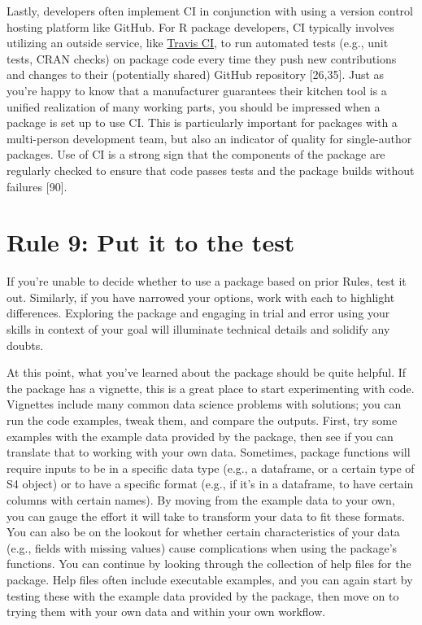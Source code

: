 \documentclass[10pt,letterpaper]{article}
\begin{document}
Lastly, developers often implement CI in conjunction with using a
version control hosting platform like GitHub. For R package developers,
CI typically involves utilizing an outside service, like
\href{https://travis-ci.org/}{Travis CI}, to run automated tests (e.g.,
unit tests, CRAN checks) on package code every time they push new
contributions and changes to their (potentially shared) GitHub
repository {[}26,35{]}. Just as you're happy to know that a manufacturer
guarantees their kitchen tool is a unified realization of many working
parts, you should be impressed when a package is set up to use CI. This
is particularly important for packages with a multi-person development
team, but also an indicator of quality for single-author packages. Use
of CI is a strong sign that the components of the package are regularly
checked to ensure that code passes tests and the package builds without
failures {[}90{]}.

\hypertarget{rule-9-put-it-to-the-test}{%
\section{Rule 9: Put it to the test}\label{rule-9-put-it-to-the-test}}

If you're unable to decide whether to use a package based on prior
Rules, test it out. Similarly, if you have narrowed your options, work
with each to highlight differences. Exploring the package and engaging
in trial and error using your skills in context of your goal will
illuminate technical details and solidify any doubts.

At this point, what you've learned about the package should be quite
helpful. If the package has a vignette, this is a great place to start
experimenting with code. Vignettes include many common data science
problems with solutions; you can run the code examples, tweak them, and
compare the outputs. First, try some examples with the example data
provided by the package, then see if you can translate that to working
with your own data. Sometimes, package functions will require inputs to
be in a specific data type (e.g., a dataframe, or a certain type of S4
object) or to have a specific format (e.g., if it's in a dataframe, to
have certain columns with certain names). By moving from the example
data to your own, you can gauge the effort it will take to transform
your data to fit these formats. You can also be on the lookout for
whether certain characteristics of your data (e.g., fields with missing
values) cause complications when using the package's functions. You can
continue by looking through the collection of help files for the
package. Help files often include executable examples, and you can again
start by testing these with the example data provided by the package,
then move on to trying them with your own data and within your own
workflow.
\end{document}
